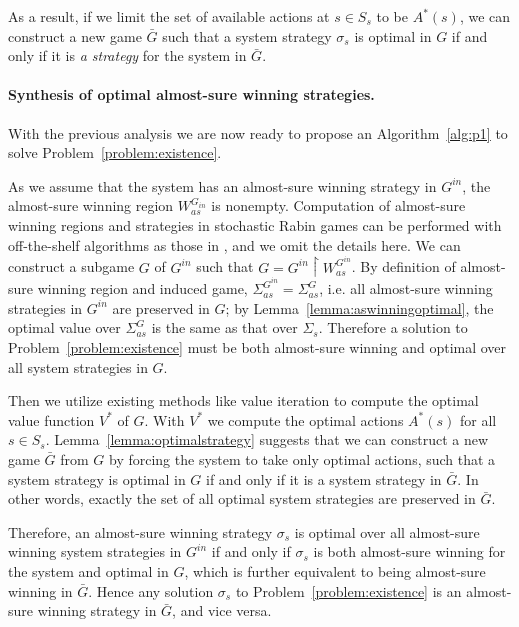 \documentclass[runningheads,a4paper]{llncs}
\begin{document}
As a result, if we limit the set of available actions at $s \in S_s$ to be $A^*(s)$, we can construct a new game $\bar{G}$ such that a system strategy $\sigma_s$ is optimal in $G$ if and only if it is \emph{a strategy} for the system in $\bar{G}$. 

\paragraph{Synthesis of optimal almost-sure winning strategies.} With the previous analysis we are now ready to propose an Algorithm~\ref{alg:p1} to solve Problem~\ref{problem:existence}. 




As we assume that the system has an almost-sure winning strategy in $G^{in}$, the almost-sure winning region $W_{as}^{G_{in}}$ is nonempty. Computation of almost-sure winning regions and strategies in stochastic Rabin games can be performed with off-the-shelf algorithms as those in \cite{chatterjee2005complexity, chatterjee2006strategy}, and we omit the details here. 
We can construct a subgame $G$ of $G^{in}$ such that $G = G^{in} \upharpoonright W_{as}^{G^{in}}$. By definition of almost-sure winning region and induced game, $\Sigma_{as}^{G^{in}} = \Sigma_{as}^G$, i.e. all almost-sure winning strategies in $G^{in}$ are preserved in $G$; by Lemma~\ref{lemma:aswinningoptimal}, the optimal value over $\Sigma_{as}^G$ is the same as that over $\Sigma_s$. 
Therefore a solution to Problem~\ref{problem:existence} must be both almost-sure winning and optimal over all system strategies in $G$. 


Then we utilize existing methods like value iteration to compute the optimal value function $V^*$ of $G$. With $V^*$ we compute the optimal actions $A^*(s)$ for all $s \in S_s$. Lemma~\ref{lemma:optimalstrategy} suggests that we can construct a new game $\bar{G}$ from $G$ by forcing the system to take only optimal actions, such that a system strategy is optimal in $G$ if and only if it is a system strategy in $\bar{G}$. In other words, exactly the set of all optimal system strategies are preserved in $\bar{G}$. 

Therefore, an almost-sure winning strategy $\sigma_s$ is optimal over all almost-sure winning system strategies in $G^{in}$ if and only if $\sigma_s$ is both almost-sure winning for the system and optimal in $G$, which is further equivalent to being almost-sure winning in $\bar{G}$. Hence any solution $\sigma_s$ to Problem~\ref{problem:existence} is an almost-sure winning strategy in $\bar{G}$, and vice versa. 
\end{document}

